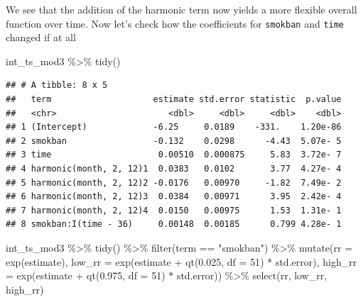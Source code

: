 \documentclass[
]{book}
\newenvironment{Shaded}{\begin{snugshade}}{\end{snugshade}}
\newcommand{\AttributeTok}[1]{\textcolor[rgb]{0.77,0.63,0.00}{#1}}
\newcommand{\DecValTok}[1]{\textcolor[rgb]{0.00,0.00,0.81}{#1}}
\newcommand{\FloatTok}[1]{\textcolor[rgb]{0.00,0.00,0.81}{#1}}
\newcommand{\FunctionTok}[1]{\textcolor[rgb]{0.00,0.00,0.00}{#1}}
\newcommand{\NormalTok}[1]{#1}
\newcommand{\SpecialCharTok}[1]{\textcolor[rgb]{0.00,0.00,0.00}{#1}}
\newcommand{\StringTok}[1]{\textcolor[rgb]{0.31,0.60,0.02}{#1}}
\begin{document}
We see that the addition of the harmonic term now yields a more flexible overall function over time. Now let's check how the coefficients for \texttt{smokban} and \texttt{time} changed if at all

\begin{Shaded}
\begin{Highlighting}[]
\NormalTok{int\_ts\_mod3 }\SpecialCharTok{\%\textgreater{}\%} 
  \FunctionTok{tidy}\NormalTok{()}
\end{Highlighting}
\end{Shaded}

\begin{verbatim}
## # A tibble: 8 x 5
##   term                    estimate std.error statistic  p.value
##   <chr>                      <dbl>     <dbl>     <dbl>    <dbl>
## 1 (Intercept)             -6.25     0.0189    -331.    1.20e-86
## 2 smokban                 -0.132    0.0298      -4.43  5.07e- 5
## 3 time                     0.00510  0.000875     5.83  3.72e- 7
## 4 harmonic(month, 2, 12)1  0.0383   0.0102       3.77  4.27e- 4
## 5 harmonic(month, 2, 12)2 -0.0176   0.00970     -1.82  7.49e- 2
## 6 harmonic(month, 2, 12)3  0.0384   0.00971      3.95  2.42e- 4
## 7 harmonic(month, 2, 12)4  0.0150   0.00975      1.53  1.31e- 1
## 8 smokban:I(time - 36)     0.00148  0.00185      0.799 4.28e- 1
\end{verbatim}

\begin{Shaded}
\begin{Highlighting}[]
\NormalTok{int\_ts\_mod3 }\SpecialCharTok{\%\textgreater{}\%} 
  \FunctionTok{tidy}\NormalTok{() }\SpecialCharTok{\%\textgreater{}\%} 
  \FunctionTok{filter}\NormalTok{(term }\SpecialCharTok{==} \StringTok{"smokban"}\NormalTok{) }\SpecialCharTok{\%\textgreater{}\%} 
  \FunctionTok{mutate}\NormalTok{(}\AttributeTok{rr =} \FunctionTok{exp}\NormalTok{(estimate), }
         \AttributeTok{low\_rr =} \FunctionTok{exp}\NormalTok{(estimate }\SpecialCharTok{+} \FunctionTok{qt}\NormalTok{(}\FloatTok{0.025}\NormalTok{, }\AttributeTok{df =} \DecValTok{51}\NormalTok{) }\SpecialCharTok{*}\NormalTok{ std.error), }
         \AttributeTok{high\_rr =} \FunctionTok{exp}\NormalTok{(estimate }\SpecialCharTok{+} \FunctionTok{qt}\NormalTok{(}\FloatTok{0.975}\NormalTok{, }\AttributeTok{df =} \DecValTok{51}\NormalTok{) }\SpecialCharTok{*}\NormalTok{ std.error)) }\SpecialCharTok{\%\textgreater{}\%} 
  \FunctionTok{select}\NormalTok{(rr, low\_rr, high\_rr)}
\end{Highlighting}
\end{Shaded}
\end{document}
